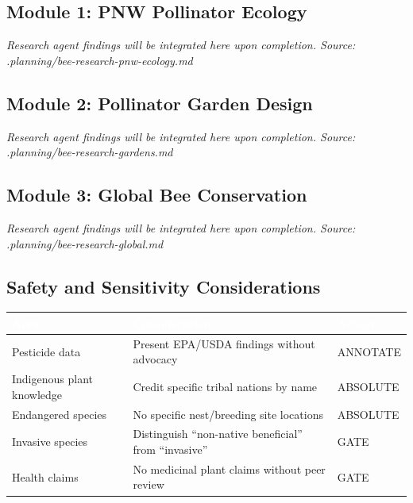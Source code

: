 \documentclass[11pt,letterpaper]{article}
\newcommand{\tableheader}[1]{\textbf{\sffamily\textcolor{white}{#1}}}
\begin{document}

\subsection{Module 1: PNW Pollinator Ecology}

\textit{Research agent findings will be integrated here upon completion. Source: .planning/bee-research-pnw-ecology.md}

\subsection{Module 2: Pollinator Garden Design}

\textit{Research agent findings will be integrated here upon completion. Source: .planning/bee-research-gardens.md}

\subsection{Module 3: Global Bee Conservation}

\textit{Research agent findings will be integrated here upon completion. Source: .planning/bee-research-global.md}

\subsection{Safety and Sensitivity Considerations}

\begin{center}
\begin{tabularx}{\textwidth}{L{3cm}XL{2cm}}
\toprule
{}
\tableheader{Area} & \tableheader{Consideration} & \tableheader{Action} \\
\midrule
Pesticide data & Present EPA/USDA findings without advocacy & ANNOTATE \\
Indigenous plant knowledge & Credit specific tribal nations by name & ABSOLUTE \\
Endangered species & No specific nest/breeding site locations & ABSOLUTE \\
Invasive species & Distinguish ``non-native beneficial'' from ``invasive'' & GATE \\
Health claims & No medicinal plant claims without peer review & GATE \\
\bottomrule
\end{tabularx}
\end{center}
\end{document}
